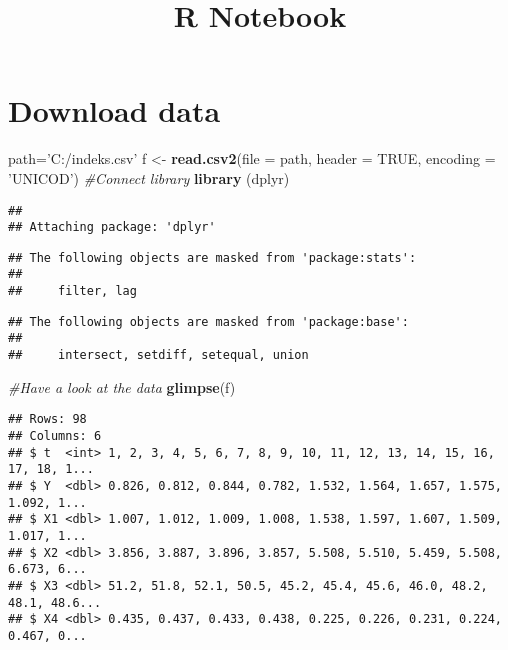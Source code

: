 \documentclass[]{article}
\title{R Notebook}
\author{}
\date{\vspace{-2.5em}}
\newenvironment{Shaded}{\begin{snugshade}}{\end{snugshade}}
\newcommand{\KeywordTok}[1]{\textcolor[rgb]{0.13,0.29,0.53}{\textbf{#1}}}
\newcommand{\DataTypeTok}[1]{\textcolor[rgb]{0.13,0.29,0.53}{#1}}
\newcommand{\StringTok}[1]{\textcolor[rgb]{0.31,0.60,0.02}{#1}}
\newcommand{\CommentTok}[1]{\textcolor[rgb]{0.56,0.35,0.01}{\textit{#1}}}
\newcommand{\OtherTok}[1]{\textcolor[rgb]{0.56,0.35,0.01}{#1}}
\newcommand{\NormalTok}[1]{#1}
\begin{document}
\maketitle

\section{Download data}\label{download-data}

\begin{Shaded}
\begin{Highlighting}[]
\NormalTok{path=}\StringTok{'C:/indeks.csv'}
\NormalTok{f <-}\StringTok{ }\KeywordTok{read.csv2}\NormalTok{(}\DataTypeTok{file =}\NormalTok{ path, }\DataTypeTok{header =} \OtherTok{TRUE}\NormalTok{, }\DataTypeTok{encoding =} \StringTok{'UNICOD'}\NormalTok{)}
\CommentTok{#Connect library}
\KeywordTok{library}\NormalTok{ (dplyr)}
\end{Highlighting}
\end{Shaded}

\begin{verbatim}
## 
## Attaching package: 'dplyr'
\end{verbatim}

\begin{verbatim}
## The following objects are masked from 'package:stats':
## 
##     filter, lag
\end{verbatim}

\begin{verbatim}
## The following objects are masked from 'package:base':
## 
##     intersect, setdiff, setequal, union
\end{verbatim}

\begin{Shaded}
\begin{Highlighting}[]
\CommentTok{#Have a look at the data}
\KeywordTok{glimpse}\NormalTok{(f)  }
\end{Highlighting}
\end{Shaded}

\begin{verbatim}
## Rows: 98
## Columns: 6
## $ t  <int> 1, 2, 3, 4, 5, 6, 7, 8, 9, 10, 11, 12, 13, 14, 15, 16, 17, 18, 1...
## $ Y  <dbl> 0.826, 0.812, 0.844, 0.782, 1.532, 1.564, 1.657, 1.575, 1.092, 1...
## $ X1 <dbl> 1.007, 1.012, 1.009, 1.008, 1.538, 1.597, 1.607, 1.509, 1.017, 1...
## $ X2 <dbl> 3.856, 3.887, 3.896, 3.857, 5.508, 5.510, 5.459, 5.508, 6.673, 6...
## $ X3 <dbl> 51.2, 51.8, 52.1, 50.5, 45.2, 45.4, 45.6, 46.0, 48.2, 48.1, 48.6...
## $ X4 <dbl> 0.435, 0.437, 0.433, 0.438, 0.225, 0.226, 0.231, 0.224, 0.467, 0...
\end{verbatim}
\end{document}
